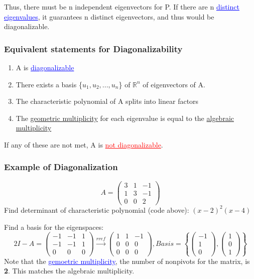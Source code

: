 \documentclass{article}
\newcommand{\bul}[1]{\textcolor{blue}{\underline{#1}}}
\newcommand{\rul}[1]{\textcolor{red}{\underline{#1}}}
\newcommand{\sbreak}{\vspace{10pt}}
\begin{document}
\sbreak
Thus, there must be n independent eigenvectors for P. If there are n \bul{distinct eigenvalues}, it guarantees n distinct eigenvectors, and thus would be diagonalizable.

\subsubsection{Equivalent statements for Diagonalizability}
\begin{enumerate}
    \item A is \bul{diagonalizable}
    \item There exists a basis \{$u_1,u_2,...,u_n$\} of $\mathbb{R}^n$ of eigenvectors of A.
    \item The characteristic polynomial of A splits into linear factors
    \item The \underline{geometric multiplicity} for each eigenvalue is equal to the \underline{algebraic multiplicity}
\end{enumerate}

If any of these are not met, A is \rul{not diagonalizable}.

\subsubsection{Example of Diagonalization}
\[A = \begin{pmatrix}
    3 & 1 & -1\\
    1 & 3 & -1\\
    0 & 0 & 2
\end{pmatrix}
\]
Find determinant of characteristic polynomial (code above): $(x-2)^2(x-4)$

Find a basis for the eigenspaces:
\[2I - A = \begin{pmatrix}
    -1 & -1 & 1\\
    -1 & -1 & 1\\
    0 & 0 & 0
\end{pmatrix} \xrightarrow{rref} \begin{pmatrix}
    1 & 1 & -1\\
    0&0&0\\
    0&0&0
\end{pmatrix}, Basis = \left\{
    \begin{pmatrix}
        -1 \\
        1\\
        0
    \end{pmatrix},
    \begin{pmatrix}
        1\\
        0\\
        1
    \end{pmatrix}
    \right\}
\]
Note that the \bul{gemoetric multiplicity}, the number of nonpivots for the matrix, is \textbf{2}. This matches the algebraic multiplicity.
\end{document}

